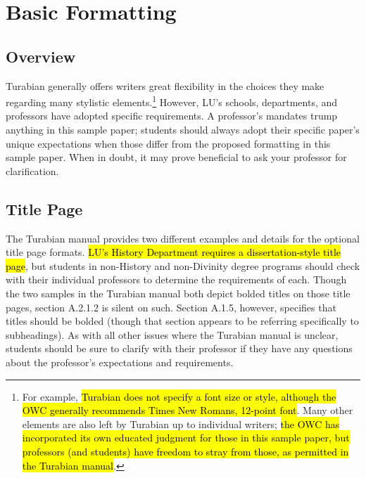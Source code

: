 \documentclass[raggedright]{turabian-researchpaper}
\begin{document}
\section{Basic Formatting}

\subsection{Overview}

Turabian generally offers writers great flexibility in the choices they make
regarding many stylistic elements.\footnote{For example, \hl{Turabian does not
specify a font size or style, although the OWC generally recommends Times New
Romans, 12-point font}. Many other elements are also left by Turabian up to
individual writers; \hl{the OWC has incorporated its own educated judgment for
those in this sample paper, but professors (and students) have freedom to stray
from those, as permitted in the Turabian manual}.} However, LU's schools,
departments, and professors have adopted specific requirements. A professor's
mandates trump anything in this sample paper; students should always adopt their
specific paper's unique expectations when those differ from the proposed
formatting in this sample paper. When in doubt, it may prove beneficial to ask
your professor for clarification.

\subsection{Title Page}

The Turabian manual provides two different examples and details for the optional
title page formats.\autocite[377-76]{Turabian} \hl{LU's History Department
requires a dissertation-style title page}, but students in non-History and
non-Divinity degree programs should check with their individual professors to
determine the requirements of each. Though the two samples in the Turabian
manual\autocite[376]{Turabian} both depict bolded titles on those title pages,
section A.2.1.2\autocite[376]{Turabian} is silent on such. Section A.1.5,
however, specifies that titles should be bolded (though that section appears to
be referring specifically to subheadings).\autocite[374-75]{Turabian} As with
all other issues where the Turabian manual is unclear, students should be sure
to clarify with their professor if they have any questions about the professor's
expectations and requirements.
\end{document}
